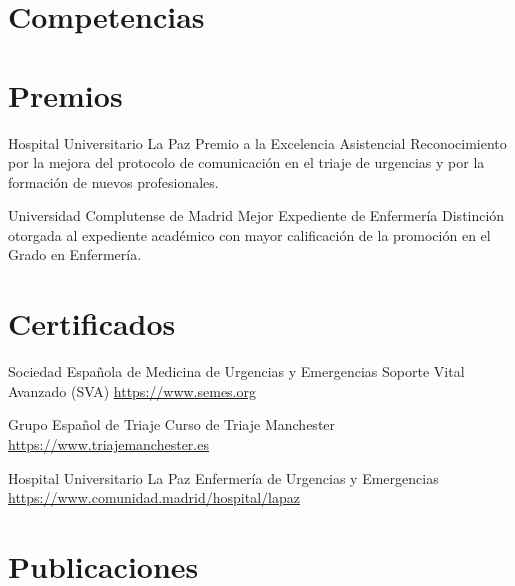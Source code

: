 \documentclass[a4paper, serif, 10pt]{moderncv}
\begin{document}
\section{Competencias}

\section{Premios}

        {Hospital Universitario La Paz}
        {Premio a la Excelencia Asistencial}
        {}
        {}
        {Reconocimiento por la mejora del protocolo de comunicación en el triaje de urgencias y por la formación de nuevos profesionales.}

        {Universidad Complutense de Madrid}
        {Mejor Expediente de Enfermería}
        {}
        {}
        {Distinción otorgada al expediente académico con mayor calificación de la promoción en el Grado en Enfermería.}
\section{Certificados}

        {Sociedad Española de Medicina de Urgencias y Emergencias}
        {Soporte Vital Avanzado (SVA)}
        {\url{https://www.semes.org}}
        {}
        {}

        {Grupo Español de Triaje}
        {Curso de Triaje Manchester}
        {\url{https://www.triajemanchester.es}}
        {}
        {}

        {Hospital Universitario La Paz}
        {Enfermería de Urgencias y Emergencias}
        {\url{https://www.comunidad.madrid/hospital/lapaz}}
        {}
        {}
\section{Publicaciones}
\end{document}
